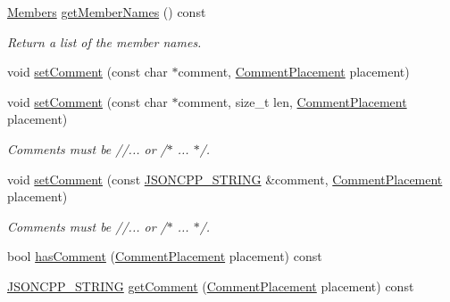 \begin{DoxyCompactItemize}
\hyperlink{classJson_1_1Value_a9ae9069983fc38f1928d76f9c79ac64d_a9ae9069983fc38f1928d76f9c79ac64d}{Members} \hyperlink{classJson_1_1Value_a79d7725dce6260317333e69022367ac9_a79d7725dce6260317333e69022367ac9}{get\+Member\+Names} () const
\begin{DoxyCompactList}\small\item\em Return a list of the member names. \end{DoxyCompactList}\item 
void \hyperlink{classJson_1_1Value_a29f3a30f7e5d3af6f38d57999bf5b480_a29f3a30f7e5d3af6f38d57999bf5b480}{set\+Comment} (const char $\ast$comment, \hyperlink{namespaceJson_a4fc417c23905b2ae9e2c47d197a45351_a4fc417c23905b2ae9e2c47d197a45351}{Comment\+Placement} placement)
\item 
void \hyperlink{classJson_1_1Value_a2900152a2887b410a9ddabe278b9d492_a2900152a2887b410a9ddabe278b9d492}{set\+Comment} (const char $\ast$comment, size\+\_\+t len, \hyperlink{namespaceJson_a4fc417c23905b2ae9e2c47d197a45351_a4fc417c23905b2ae9e2c47d197a45351}{Comment\+Placement} placement)
\begin{DoxyCompactList}\small\item\em Comments must be //... or /$\ast$ ... $\ast$/. \end{DoxyCompactList}\item 
void \hyperlink{classJson_1_1Value_a2c5d13a5f45eb77e912008778e65b27f_a2c5d13a5f45eb77e912008778e65b27f}{set\+Comment} (const \hyperlink{json_8h_a1e723f95759de062585bc4a8fd3fa4be_a1e723f95759de062585bc4a8fd3fa4be}{J\+S\+O\+N\+C\+P\+P\+\_\+\+S\+T\+R\+I\+NG} \&comment, \hyperlink{namespaceJson_a4fc417c23905b2ae9e2c47d197a45351_a4fc417c23905b2ae9e2c47d197a45351}{Comment\+Placement} placement)
\begin{DoxyCompactList}\small\item\em Comments must be //... or /$\ast$ ... $\ast$/. \end{DoxyCompactList}\item 
bool \hyperlink{classJson_1_1Value_a65d8e3ab6a5871cbd019a3e0f0b944a3_a65d8e3ab6a5871cbd019a3e0f0b944a3}{has\+Comment} (\hyperlink{namespaceJson_a4fc417c23905b2ae9e2c47d197a45351_a4fc417c23905b2ae9e2c47d197a45351}{Comment\+Placement} placement) const
\item 
\hyperlink{json_8h_a1e723f95759de062585bc4a8fd3fa4be_a1e723f95759de062585bc4a8fd3fa4be}{J\+S\+O\+N\+C\+P\+P\+\_\+\+S\+T\+R\+I\+NG} \hyperlink{classJson_1_1Value_a82817229a986f0b254e31d5c83066ffe_a82817229a986f0b254e31d5c83066ffe}{get\+Comment} (\hyperlink{namespaceJson_a4fc417c23905b2ae9e2c47d197a45351_a4fc417c23905b2ae9e2c47d197a45351}{Comment\+Placement} placement) const

\end{DoxyCompactItemize}
